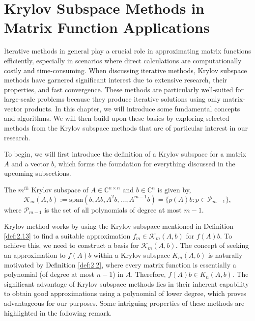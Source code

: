 \chapter{Krylov Subspace Methods in Matrix Function Applications}
\label{sec:kryl_subspace_app}

Iterative methods in general play a crucial role in approximating matrix functions efficiently, especially in scenarios where direct calculations are computationally costly and time-consuming. When discussing iterative methods, Krylov subspace methods have garnered significant interest due to extensive research, their properties, and fast convergence. These methods are particularly well-suited for large-scale problems because they produce iterative solutions using only matrix-vector products. In this chapter, we will introduce some fundamental concepts and algorithms. We will then build upon these basics by exploring selected methods from the Krylov subspace methods that are of particular interest in our research.

To begin, we will first introduce the definition of a Krylov subspace for a matrix $A$ and a vector $b$, which forms the foundation for everything discussed in the upcoming subsections.

\begin{definition}
    \label{def:2.13}
    \cite{37} The $m^{th}$ Krylov subspace of $A \in \mathbb{C}^{n \times n}$ and $b \in \mathbb{C}^n$ is given by,
    \[
    \mathcal{K}_m(A, b) := \text{span}(b, Ab, A^2 b, \ldots, A^{m-1} b) = \{ p(A)b : p \in \mathcal{P}_{m-1} \},
    \]
    where $\mathcal{P}_{m-1}$ is the set of all polynomials of degree at most $m - 1$.
\end{definition}

Krylov method works by using the Krylov subspace mentioned in Definition \ref{def:2.13} to find a suitable approximation $f_{m}\in \mathcal{K}_m(A,b)$ for $f(A)b$. To achieve this, we need to construct a basis for $\mathcal{K}_m(A, b)$. The concept of seeking an approximation to $f(A)b$ within a Krylov subspace $K_m(A,b)$ is naturally motivated by Definition \ref{def:2.2}, where every matrix function is essentially a polynomial (of degree at most $n-1$) in $A$. Therefore, $f(A)b \in K_n(A,b)$. The significant advantage of Krylov subspace methods lies in their inherent capability to obtain good approximations using a polynomial of lower degree, which proves advantageous for our purposes. Some intriguing properties of these methods are highlighted in the following remark.

